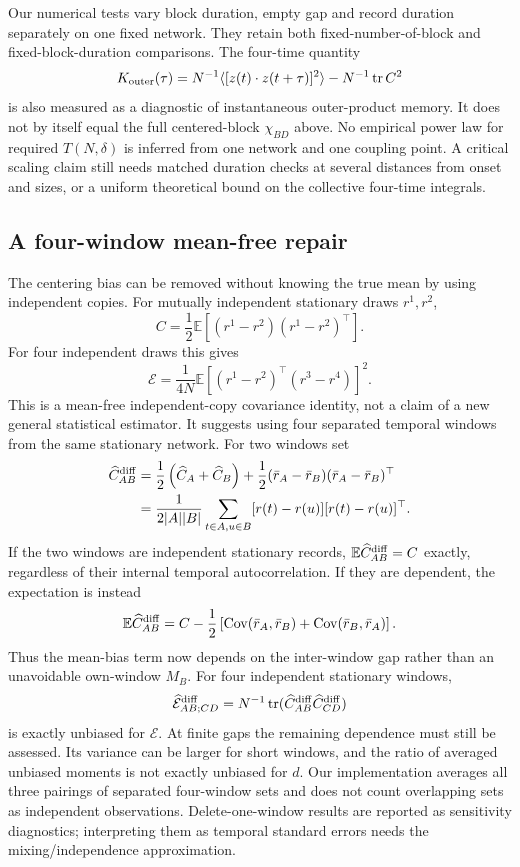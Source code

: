 Our numerical tests vary block duration, empty gap and record duration
separately on one fixed network. They retain both fixed-number-of-block and
fixed-block-duration comparisons. The four-time quantity
\[
 K_{\rm outer}(\tau)=N^{-1}\langle[z(t)\cdot z(t+\tau)]^2\rangle-
                   N^{-1}\operatorname{tr}C^2
\]
is also measured as a diagnostic of instantaneous outer-product memory. It
does not by itself equal the full centered-block $\chi_{BD}$ above.
No empirical power law for required $T(N,\delta)$ is inferred from one network
and one coupling point. A critical scaling claim still needs matched duration
checks at several distances from onset and sizes, or a uniform theoretical
bound on the collective four-time integrals.

\subsection{A four-window mean-free repair}
The centering bias can be removed without knowing the true mean by using
independent copies. For mutually independent stationary draws $r^1,r^2$,
\[
 C=\frac12\mathbb E[(r^1-r^2)(r^1-r^2)^\top].
\]
For four independent draws this gives
\[
 \boxed{\mathcal E=\frac1{4N}\mathbb E\left[
       (r^1-r^2)^\top(r^3-r^4)\right]^2.}
\]
This is a mean-free independent-copy covariance identity, not a claim of a
new general statistical estimator. It suggests using four separated temporal
windows from the same stationary network. For two windows set
\begin{align*}
 \widehat C^{\rm diff}_{AB}
 &=\frac12\left(\widehat C_A+\widehat C_B\right)
    +\frac12(\bar r_A-\bar r_B)(\bar r_A-\bar r_B)^\top\\
 &=\frac1{2|A||B|}\sum_{t\in A,u\in B}
            [r(t)-r(u)][r(t)-r(u)]^\top.
\end{align*}
If the two windows are independent stationary records,
$\mathbb E\widehat C^{\rm diff}_{AB}=C$ exactly, regardless of their
internal temporal autocorrelation. If they are dependent, the expectation is
instead
\[
 \mathbb E\widehat C^{\rm diff}_{AB}
 =C-\frac12\left[
       \operatorname{Cov}(\bar r_A,\bar r_B)
      +\operatorname{Cov}(\bar r_B,\bar r_A)\right].
\]
Thus the mean-bias term now depends on the inter-window gap rather than an
unavoidable own-window $M_B$. For four independent stationary windows,
\[
 \widehat{\mathcal E}_{AB;CD}^{\rm diff}
 =N^{-1}\operatorname{tr}(\widehat C^{\rm diff}_{AB}
                         \widehat C^{\rm diff}_{CD})
\]
is exactly unbiased for $\mathcal E$. At finite gaps the remaining dependence
must still be assessed. Its variance can be larger for short windows, and
the ratio of averaged unbiased moments is not exactly unbiased for $d$.
Our implementation averages all three pairings of separated four-window
sets and does not count overlapping sets as independent observations.
Delete-one-window results are reported as sensitivity diagnostics; interpreting
them as temporal standard errors needs the mixing/independence approximation.

